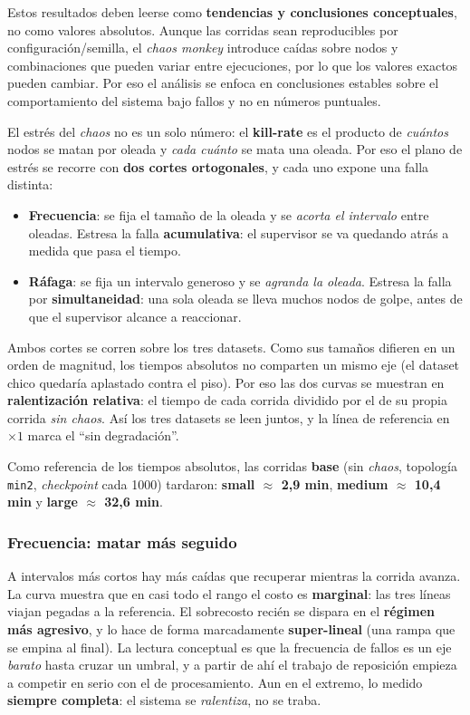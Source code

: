 \documentclass[12pt,a4paper]{article}
\begin{document}
Estos resultados deben leerse como \textbf{tendencias y conclusiones
conceptuales},
no como valores absolutos. Aunque las corridas sean reproducibles por
configuración/semilla, el \textit{chaos monkey} introduce caídas sobre nodos y
combinaciones que pueden variar entre ejecuciones, por lo que los
valores exactos
pueden cambiar. Por eso el análisis se enfoca en conclusiones estables sobre el
comportamiento del sistema bajo fallos y no en números puntuales.

El estrés del \textit{chaos} no es un solo número: el
\textbf{kill-rate} es el producto de
\emph{cuántos} nodos se matan por oleada y \emph{cada cuánto} se mata
una oleada. Por eso el
plano de estrés se recorre con \textbf{dos cortes ortogonales}, y
cada uno expone una falla
distinta:
\begin{itemize}
    \item \textbf{Frecuencia}: se fija el tamaño de la oleada y se
        \emph{acorta el intervalo}
        entre oleadas. Estresa la falla \textbf{acumulativa}: el
        supervisor se va quedando atrás a
        medida que pasa el tiempo.
    \item \textbf{Ráfaga}: se fija un intervalo generoso y se
        \emph{agranda la oleada}. Estresa
        la falla por \textbf{simultaneidad}: una sola oleada se lleva
        muchos nodos de golpe, antes
        de que el supervisor alcance a reaccionar.
\end{itemize}
Ambos cortes se corren sobre los tres datasets. Como sus tamaños
difieren en un orden de
magnitud, los tiempos absolutos no comparten un mismo eje (el dataset
    chico quedaría aplastado
contra el piso). Por eso las dos curvas se muestran en
\textbf{ralentización relativa}: el
tiempo de cada corrida dividido por el de su propia corrida \emph{sin
chaos}. Así los tres
datasets se leen juntos, y la línea de referencia en $\times 1$ marca
el ``sin degradación''.

Como referencia de los tiempos absolutos, las corridas \textbf{base}
(sin \textit{chaos}, topología \texttt{min2}, \textit{checkpoint} cada
1000) tardaron: \textbf{small $\approx$ 2,9 min}, \textbf{medium
$\approx$ 10,4 min} y \textbf{large $\approx$ 32,6 min}.

\subsubsection{Frecuencia: matar más seguido}
A intervalos más cortos hay más caídas que recuperar mientras la
corrida avanza. La curva
muestra que en casi todo el rango el costo es \textbf{marginal}: las
tres líneas viajan
pegadas a la referencia. El sobrecosto recién se dispara en el
\textbf{régimen más agresivo},
y lo hace de forma marcadamente \textbf{super-lineal} (una rampa que
se empina al final). La
lectura conceptual es que la frecuencia de fallos es un eje
\emph{barato} hasta cruzar un
umbral, y a partir de ahí el trabajo de reposición empieza a competir
en serio con el de
procesamiento. Aun en el extremo, lo medido \textbf{siempre
completa}: el sistema se
\emph{ralentiza}, no se traba.
\end{document}
